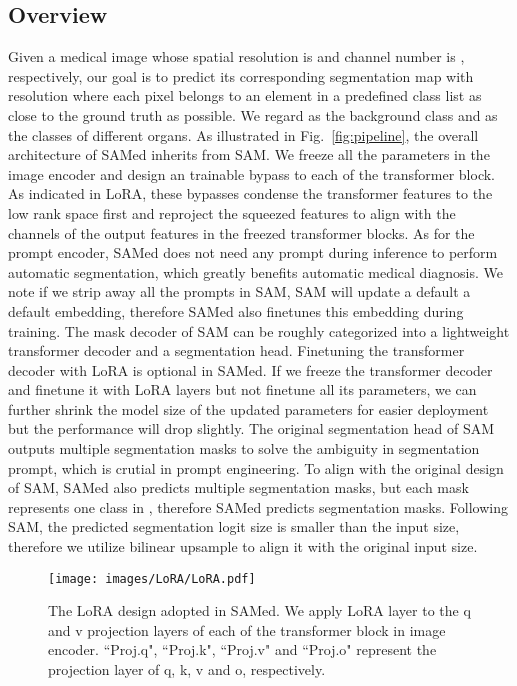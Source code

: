 \documentclass[runningheads]{llncs}
\begin{document}
\subsection{Overview} Given a medical image  whose spatial resolution is  and channel number is , respectively, our goal is to predict its corresponding segmentation map  with resolution  where each pixel belongs to an element in a predefined class list  as close to the ground truth  as possible. We regard  as the background class and  as the classes of different organs. As illustrated in Fig.~\ref{fig:pipeline}, the overall architecture of SAMed inherits from SAM. We freeze all the parameters in the image encoder and design an trainable bypass to each of the transformer block. As indicated in LoRA, these bypasses condense the transformer features to the low rank space first and reproject the squeezed features to align with the channels of the output features in the freezed transformer blocks. As for the prompt encoder, SAMed does not need any prompt during inference to perform automatic segmentation, which greatly benefits automatic medical diagnosis. We note if we strip away all the prompts in SAM, SAM will update a default a default embedding, therefore SAMed also finetunes this embedding during training. The mask decoder of SAM can be roughly categorized into a lightweight transformer decoder and a segmentation head. Finetuning the transformer decoder with LoRA is optional in SAMed. If we freeze the transformer decoder and finetune it with LoRA layers but not finetune all its parameters, we can further shrink the model size of the updated parameters for easier deployment but the performance will drop slightly. The original segmentation head of SAM outputs multiple segmentation masks to solve the ambiguity in segmentation prompt, which is crutial in prompt engineering. To align with the original design of SAM, SAMed also predicts multiple segmentation masks, but each mask represents one class in , therefore SAMed predicts  segmentation masks. Following SAM, the predicted segmentation logit size  is smaller than the input size, therefore we utilize bilinear upsample to align it with the original input size.

\begin{figure*}[t]
\begin{center}
\texttt{[image: images/LoRA/LoRA.pdf]}
\end{center}
   \caption{The LoRA design adopted in SAMed. We apply LoRA layer to the q and v projection layers of each of the transformer block in image encoder. ``Proj.q", ``Proj.k", ``Proj.v" and ``Proj.o" represent the projection layer of q, k, v and o, respectively.}
\label{fig:lora}
\end{figure*}
\end{document}
